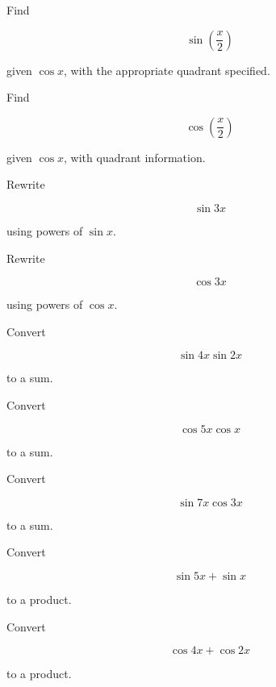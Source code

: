 \begin{exercise}[2]
Find

\[
\sin\left(\frac{x}{2}\right)
\]

given \(\cos x\), with the appropriate quadrant specified.
\end{exercise}

\begin{exercise}[2]
Find

\[
\cos\left(\frac{x}{2}\right)
\]

given \(\cos x\), with quadrant information.
\end{exercise}

\begin{exercise}[2]
Rewrite

\[
\sin3x
\]

using powers of \(\sin x\).
\end{exercise}

\begin{exercise}[2]
Rewrite

\[
\cos3x
\]

using powers of \(\cos x\).
\end{exercise}

\begin{exercise}[2]
Convert

\[
\sin4x\sin2x
\]

to a sum.
\end{exercise}

\begin{exercise}[2]
Convert

\[
\cos5x\cos x
\]

to a sum.
\end{exercise}

\begin{exercise}[2]
Convert

\[
\sin7x\cos3x
\]

to a sum.
\end{exercise}

\begin{exercise}[2]
Convert

\[
\sin5x+\sin x
\]

to a product.
\end{exercise}

\begin{exercise}[2]
Convert

\[
\cos4x+\cos2x
\]

to a product.
\end{exercise}

